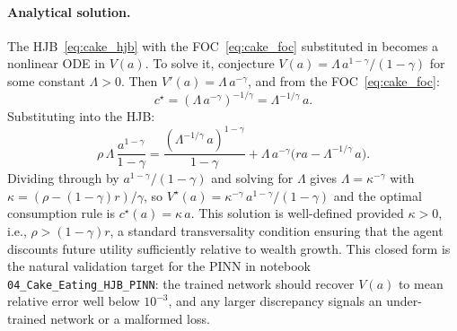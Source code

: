 \documentclass[11pt,a4paper]{report}
\begin{document}
\paragraph{Analytical solution.}  The HJB~\eqref{eq:cake_hjb} with the FOC~\eqref{eq:cake_foc} substituted in becomes a nonlinear ODE in $V(a)$.  To solve it, conjecture $V(a) = \Lambda\, a^{1-\gamma}/(1-\gamma)$ for some constant $\Lambda > 0$.  Then $V'(a) = \Lambda\, a^{-\gamma}$, and from the FOC~\eqref{eq:cake_foc}:
\begin{equation}
c^\star = (\Lambda\, a^{-\gamma})^{-1/\gamma} = \Lambda^{-1/\gamma}\, a.
\end{equation}
Substituting into the HJB:
\begin{equation}
\rho\,\Lambda\,\frac{a^{1-\gamma}}{1-\gamma}
= \frac{(\Lambda^{-1/\gamma}\,a)^{1-\gamma}}{1-\gamma} + \Lambda\, a^{-\gamma}\bigl(ra - \Lambda^{-1/\gamma}\,a\bigr).
\end{equation}
Dividing through by $a^{1-\gamma}/(1-\gamma)$ and solving for $\Lambda$ gives $\Lambda = \kappa^{-\gamma}$ with $\kappa = (\rho - (1-\gamma)r)/\gamma$, so $V^\star(a) = \kappa^{-\gamma}\,a^{1-\gamma}/(1-\gamma)$ and the optimal consumption rule is $c^\star(a) = \kappa\, a$.  This solution is well-defined provided $\kappa > 0$, i.e., $\rho > (1-\gamma)r$, a standard transversality condition ensuring that the agent discounts future utility sufficiently relative to wealth growth.  This closed form is the natural validation target for the PINN in notebook \texttt{04\_Cake\_Eating\_HJB\_PINN}: the trained network should recover $V(a)$ to mean relative error well below $10^{-3}$, and any larger discrepancy signals an under-trained network or a malformed loss.
\end{document}
